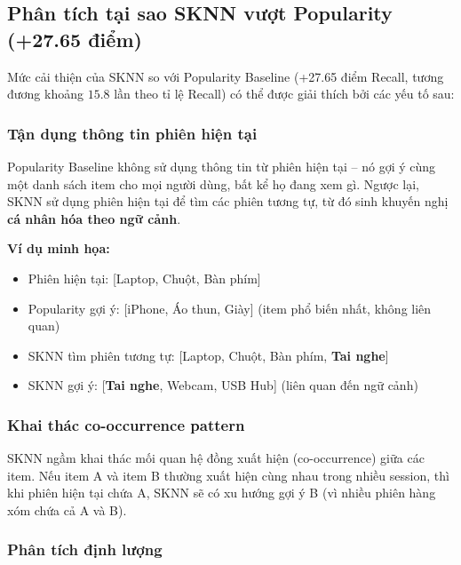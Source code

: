 \documentclass[12pt, a4paper]{article}
\begin{document}
\subsection{Phân tích tại sao SKNN vượt Popularity (+27.65 điểm)}

Mức cải thiện của SKNN so với Popularity Baseline (+27.65 điểm Recall, tương đương khoảng $15.8$ lần theo tỉ lệ Recall) có thể được giải thích bởi các yếu tố sau:

\subsubsection{Tận dụng thông tin phiên hiện tại}

Popularity Baseline không sử dụng thông tin từ phiên hiện tại -- nó gợi ý cùng một danh sách item cho mọi người dùng, bất kể họ đang xem gì. Ngược lại, SKNN sử dụng phiên hiện tại để tìm các phiên tương tự, từ đó sinh khuyến nghị \textbf{cá nhân hóa theo ngữ cảnh}.

\textbf{Ví dụ minh họa:}
\begin{itemize}
    \item Phiên hiện tại: [Laptop, Chuột, Bàn phím]
    \item Popularity gợi ý: [iPhone, Áo thun, Giày] (item phổ biến nhất, không liên quan)
    \item SKNN tìm phiên tương tự: [Laptop, Chuột, Bàn phím, \textbf{Tai nghe}]
    \item SKNN gợi ý: [\textbf{Tai nghe}, Webcam, USB Hub] (liên quan đến ngữ cảnh)
\end{itemize}

\subsubsection{Khai thác co-occurrence pattern}

SKNN ngầm khai thác mối quan hệ đồng xuất hiện (co-occurrence) giữa các item. Nếu item A và item B thường xuất hiện cùng nhau trong nhiều session, thì khi phiên hiện tại chứa A, SKNN sẽ có xu hướng gợi ý B (vì nhiều phiên hàng xóm chứa cả A và B).

\subsubsection{Phân tích định lượng}
\end{document}
